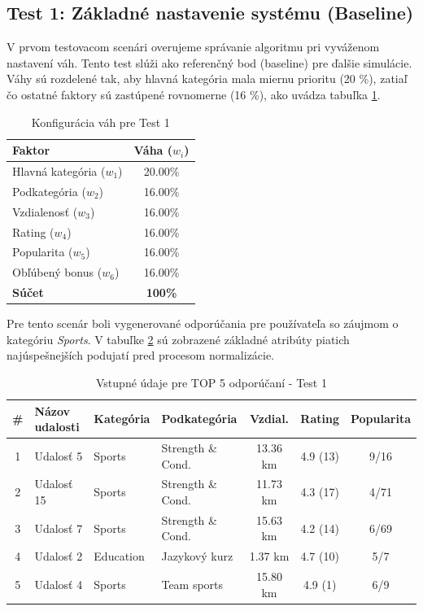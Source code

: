 
\subsection{Test 1: Základné nastavenie systému (Baseline)}

V prvom testovacom scenári overujeme správanie algoritmu pri vyváženom nastavení váh. Tento test slúži ako referenčný bod (baseline) pre ďalšie simulácie. Váhy sú rozdelené tak, aby hlavná kategória mala miernu prioritu (20 \%), zatiaľ čo ostatné faktory sú zastúpené rovnomerne (16 \%), ako uvádza tabuľka \ref{tab:vahy_test1}.

\begin{table}[H]
\centering
\begin{tabular}{|l|c|}
\hline
\textbf{Faktor} & \textbf{Váha ($w_i$)} \\
\hline
Hlavná kategória ($w_1$) & 20.00\% \\
Podkategória ($w_2$) & 16.00\% \\
Vzdialenosť ($w_3$) & 16.00\% \\
Rating ($w_4$) & 16.00\% \\
Popularita ($w_5$) & 16.00\% \\
Obľúbený bonus ($w_6$) & 16.00\% \\
\hline
\textbf{Súčet} & \textbf{100\%} \\
\hline
\end{tabular}
\caption{Konfigurácia váh pre Test 1}
\label{tab:vahy_test1}
\end{table}

Pre tento scenár boli vygenerované odporúčania pre používateľa so záujmom o kategóriu \textit{Sports}. V tabuľke \ref{tab:data_test1} sú zobrazené základné atribúty piatich najúspešnejších podujatí pred procesom normalizácie.

\begin{table}[H]
\centering
\small
\begin{tabular}{|c|l|l|l|c|c|c|}
\hline
\textbf{\#} & \textbf{Názov udalosti} & \textbf{Kategória} & \textbf{Podkategória} & \textbf{Vzdial.} & \textbf{Rating} & \textbf{Popularita} \\
\hline
1 & Udalosť 5 & Sports    & Strength \& Cond. & 13.36 km & 4.9 (13) & 9/16 \\
2 & Udalosť 15 & Sports    & Strength \& Cond. & 11.73 km & 4.3 (17) & 4/71 \\
3 & Udalosť 7 & Sports    & Strength \& Cond. & 15.63 km & 4.2 (14) & 6/69 \\
4 & Udalosť 2 & Education & Jazykový kurz     & 1.37 km  & 4.7 (10) & 5/7 \\
5 & Udalosť 4 & Sports    & Team sports       & 15.80 km & 4.9 (1)  & 6/9 \\
\hline
\end{tabular}
\caption{Vstupné údaje pre TOP 5 odporúčaní - Test 1}
\label{tab:data_test1}
\end{table}


